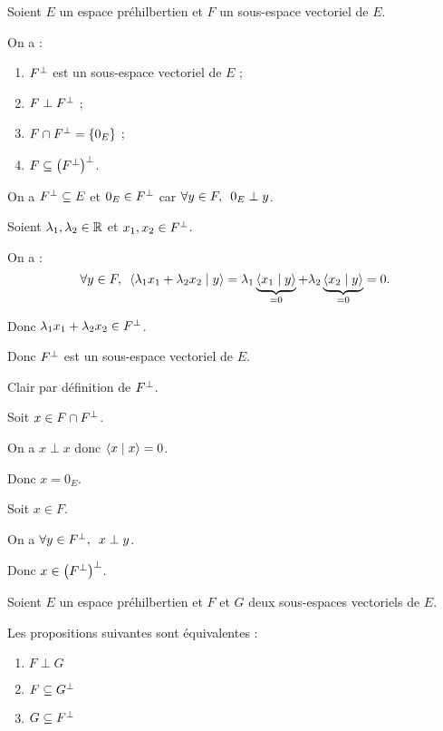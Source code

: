 \begin{prop}
Soient \(E\) un espace préhilbertien et \(F\) un sous-espace vectoriel de \(E\).

On a :

\begin{enumerate}
    \item \(F^{\perp}\) est un sous-espace vectoriel de \(E\) ; \\
    \item \(F\perp F^{\perp}\) ; \\
    \item \(F\cap F^{\perp}=\left\lbrace0_E\right\rbrace\) ; \\
    \item \(F\subseteq\left(F^{\perp}\right)^{\perp}\).
\end{enumerate}
\end{prop}

\begin{dem}[1]
On a \(F^{\perp}\subseteq E\) et \(0_E\in F^{\perp}\) car \(\quantifs{\forall y\in F}0_E\perp y\).

Soient \(\lambda_1,\lambda_2\in\mathbb{R}\) et \(x_1,x_2\in F^{\perp}\).

On a : \[\quantifs{\forall y\in F}\ps{\lambda_1x_1+\lambda_2x_2}{y}=\lambda_1\underbrace{\ps{x_1}{y}}_{=0}+\lambda_2\underbrace{\ps{x_2}{y}}_{=0}=0.\]

Donc \(\lambda_1x_1+\lambda_2x_2\in F^{\perp}\).

Donc \(F^{\perp}\) est un sous-espace vectoriel de \(E\).
\end{dem}

\begin{dem}[2]
Clair par définition de \(F^{\perp}\).
\end{dem}

\begin{dem}[3]
Soit \(x\in F\cap F^{\perp}\).

On a \(x\perp x\) donc \(\left\langle x\;\middle|\; x\right\rangle=0\).

Donc \(x=0_E\).
\end{dem}

\begin{dem}[4]
Soit \(x\in F\).

On a \(\quantifs{\forall y\in F\ortho}x\perp y\).

Donc \(x\in\left(F^{\perp}\right)^{\perp}\).
\end{dem}

\begin{rem}
Soient \(E\) un espace préhilbertien et \(F\) et \(G\) deux sous-espaces vectoriels de \(E\).

Les propositions suivantes sont équivalentes :

\begin{enumerate}
    \item \(F\perp G\) \\
    \item \(F\subseteq G^{\perp}\) \\
    \item \(G\subseteq F^{\perp}\)
\end{enumerate}
\end{rem}

